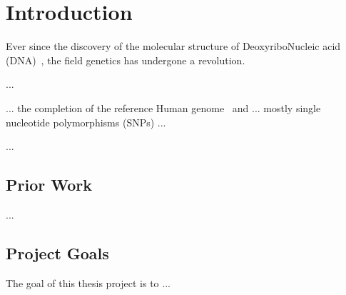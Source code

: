 

\chapter{Introduction}
\label{chap:intro}

Ever since the discovery of the molecular structure of
DeoxyriboNucleic acid (\gls{DNA})~\citep{watson1953}, the field genetics has
undergone a revolution. 

...

... the completion of the reference Human genome~\citep{human_genome2001,venter01} and ... 
mostly single nucleotide polymorphisms
(\glspl{SNP}) ...

...

\section{Prior Work}
\label{sec:priorworks}

...


\section{Project Goals}
\label{sec:goals}


The goal of this thesis project is to ...




